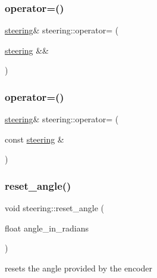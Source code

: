 \subsubsection{\texorpdfstring{operator=()}{operator=()}\hspace{0.1cm}{\footnotesize\ttfamily [1/2]}}
{\footnotesize\ttfamily \mbox{\hyperlink{classsteering}{steering}}\& steering\+::operator= (\begin{DoxyParamCaption}\item[{\mbox{\hyperlink{classsteering}{steering}} \&\&}]{ }\end{DoxyParamCaption})\hspace{0.3cm}{\ttfamily [default]}}

\mbox{\label{classsteering_ab6e1570939ecfb89acb3905efe6cb334}} 
\subsubsection{\texorpdfstring{operator=()}{operator=()}\hspace{0.1cm}{\footnotesize\ttfamily [2/2]}}
{\footnotesize\ttfamily \mbox{\hyperlink{classsteering}{steering}}\& steering\+::operator= (\begin{DoxyParamCaption}\item[{const \mbox{\hyperlink{classsteering}{steering}} \&}]{ }\end{DoxyParamCaption})\hspace{0.3cm}{\ttfamily [default]}}

\mbox{\label{classsteering_ab0fb97c4af86a1d5ed668a58fba15ba3}} 
\subsubsection{\texorpdfstring{reset\_angle()}{reset\_angle()}}
{\footnotesize\ttfamily void steering\+::reset\+\_\+angle (\begin{DoxyParamCaption}\item[{float}]{angle\+\_\+in\+\_\+radians }\end{DoxyParamCaption})\hspace{0.3cm}{\ttfamily [inline]}}



resets the angle provided by the encoder 


